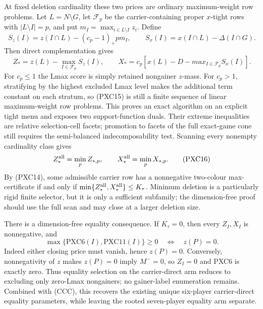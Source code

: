 \documentclass[11pt]{article}
\begin{document}
At fixed deletion cardinality these two prices are ordinary maximum-weight
row problems.  Let $L=N\setminus G$, let $\mathcal F_p$ be the
carrier-containing proper $x$-tight rows with $|L\setminus I|=p$, and put
$m_I=\max_{i\in L\setminus I}z_i$.  Define
\[
 S_z(I)=z(I\cap L)-(c_p-1)_+pm_I,\qquad
 S_x(I)=x(I\cap L)-\Delta(I\cap G).
\]
Then direct complementation gives
\[
 Z_*=z(L)-\max_{I\in\mathcal F_p}S_z(I),\qquad
 X_*=c_p\left[x(L)-D-max_{I\in\mathcal F_p}S_x(I)\right]. \tag{PXC15}
\]
For $c_p\le1$ the Lmax score is simply retained nongainer $z$-mass.  For
$c_p>1$, stratifying by the highest excluded Lmax level makes the additional
term constant on each stratum, so (PXC15) is still a finite sequence of
linear maximum-weight row problems.  This proves an exact algorithm on an
explicit tight menu and exposes two support-function duals.  Their extreme
inequalities are relative selection-cell facets; promotion to facets of the
full exact-game cone still requires the semi-balanced indecomposability test.
Scanning every nonempty cardinality class gives
\[
 Z^{\rm all}_*=\min_p Z_{*,p},\qquad
 X^{\rm all}_*=\min_p X_{*,p}.                     \tag{PXC16}
\]
By (PXC14), some admissible carrier row has a nonnegative two-colour
max-certificate if and only if
$\min\{Z^{\rm all}_*,X^{\rm all}_*\}\le K_\tau$.  Minimum deletion is a
particularly rigid finite selector, but it is only a sufficient subfamily;
the dimension-free proof should use the full scan and may close at a larger
deletion size.

There is a dimension-free equality consequence.  If $K_\tau=0$, then every
$Z_I,X_I$ is nonnegative, and
\[
 \max\{\mathrm{PXC6}(I),\mathrm{PXC11}(I)\}\ge0
 \quad\Longleftrightarrow\quad z(P)=0.             \tag{PXC17}
\]
Indeed either closing price must vanish, hence $z(P)=0$.  Conversely,
nonnegativity of $z$ makes $z(P)=0$ imply $M^-=0$, so $Z_I=0$ and PXC6 is
exactly zero.  Thus equality selection on the carrier-direct arm reduces to
excluding only zero-Lmax nongainers; no gainer-label enumeration remains.
Combined with (CCC), this recovers the existing unique six-player
carrier-direct equality parameters, while leaving the rooted seven-player
equality arm separate.
\end{document}

